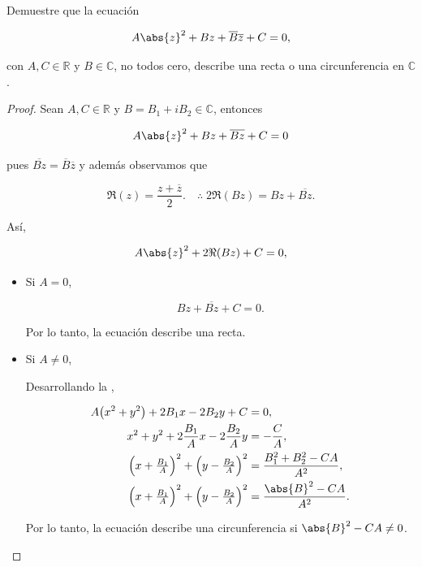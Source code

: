 \documentclass[../main.tex]{subfiles}
\begin{document}
\begin{problema}
	Demuestre que la ecuación

	\begin{equation*}
		A \abs{z}^{2} + Bz + \overline{B}\overline{z} + C = 0,
	\end{equation*}

	con \(A,C\in \mathbb{R}\) y \(B\in \mathbb{C}\), no todos cero, describe una recta o una
	circunferencia en \(\mathbb{C}\).

	\begin{proof}
		Sean \(A, C \in \mathbb{R}\) y \(B = B_{1} + iB_{2}\in \mathbb{C}\), entonces

		\begin{equation*}
			A \abs{z}^{2} + Bz + \overline{Bz} + C = 0
		\end{equation*}

		pues \(\overline{Bz} = \overline{B}\overline{z}\) y además observamos que

		\begin{equation*}
			\Re(z) = \dfrac{z + \overline{z}}{2}. \quad \therefore\; 2 \Re(Bz) =  Bz + \overline{Bz}.
		\end{equation*}

		Así,

		\begin{equation}
			A \abs{z}^{2} + 2\Re(Bz) + C = 0,
			\label{eq:gral-eq}
		\end{equation}

		\begin{itemize}
			\item Si \(A = 0\),

			      \begin{equation*}
				      Bz + \overline{Bz} + C = 0.
			      \end{equation*}

			      Por lo tanto, la ecuación describe una recta.
			\item Si \(A \neq 0\),

			      Desarrollando la ,

			      \begin{align*}
				      A \bigl(x^{2} + y^{2}\bigr) + 2B_{1}x - 2B_{2}y + C                         & = 0,              \\
				      x^{2} + y^{2} + 2\dfrac{B_{1}}{A}x - 2\dfrac{B_{2}}{A}y                     & = - \dfrac{C}{A}, \\
				      \Bigl(x + \tfrac{B_{1}}{A}\Bigr)^{2} + \Bigl(y - \tfrac{B_{2}}{A}\Bigr)^{2} & =
				      \dfrac{B_{1}^{2} + B_{2}^{2} - CA}{A^{2}},                                                      \\
				      \Bigl(x + \tfrac{B_{1}}{A}\Bigr)^{2} + \Bigl(y - \tfrac{B_{2}}{A}\Bigr)^{2} & =
				      \dfrac{\abs{B}^{2} - CA}{A^{2}}.
			      \end{align*}

			      Por lo tanto, la ecuación describe una circunferencia si \(\abs{B}^{2} - CA \neq 0\).
		\end{itemize}
	\end{proof}
\end{problema}
\end{document}
